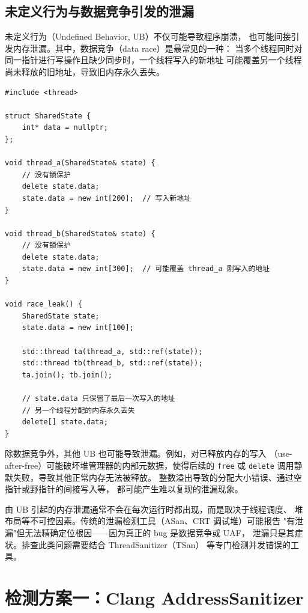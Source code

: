 \documentclass[12pt,a4paper,fontset=fandol]{ctexbook}
\begin{document}
\subsection{未定义行为与数据竞争引发的泄漏}

未定义行为（Undefined Behavior, UB）不仅可能导致程序崩溃，
也可能间接引发内存泄漏。其中，数据竞争（data race）是最常见的一种：
当多个线程同时对同一指针进行写操作且缺少同步时，一个线程写入的新地址
可能覆盖另一个线程尚未释放的旧地址，导致旧内存永久丢失。

\begin{lstlisting}[style=cppstyle, caption={数据竞争导致的内存泄漏}]
#include <thread>

struct SharedState {
    int* data = nullptr;
};

void thread_a(SharedState& state) {
    // 没有锁保护
    delete state.data;
    state.data = new int[200];  // 写入新地址
}

void thread_b(SharedState& state) {
    // 没有锁保护
    delete state.data;
    state.data = new int[300];  // 可能覆盖 thread_a 刚写入的地址
}

void race_leak() {
    SharedState state;
    state.data = new int[100];

    std::thread ta(thread_a, std::ref(state));
    std::thread tb(thread_b, std::ref(state));
    ta.join(); tb.join();

    // state.data 只保留了最后一次写入的地址
    // 另一个线程分配的内存永久丢失
    delete[] state.data;
}
\end{lstlisting}

除数据竞争外，其他 UB 也可能导致泄漏。例如，对已释放内存的写入
（use-after-free）可能破坏堆管理器的内部元数据，使得后续的 \texttt{free} 或
\texttt{delete} 调用静默失败，导致其他正常内存无法被释放。
整数溢出导致的分配大小错误、通过空指针或野指针的间接写入等，
都可能产生难以复现的泄漏现象。

\begin{warning}[title={UB 与内存泄漏的隐蔽性}]
由 UB 引起的内存泄漏通常不会在每次运行时都出现，而是取决于线程调度、
堆布局等不可控因素。传统的泄漏检测工具（ASan、CRT 调试堆）可能报告
"有泄漏"但无法精确定位根因——因为真正的 bug 是数据竞争或 UAF，
泄漏只是其症状。排查此类问题需要结合 ThreadSanitizer（TSan）
等专门检测并发错误的工具。
\end{warning}


\section{检测方案一：Clang AddressSanitizer}
\end{document}
